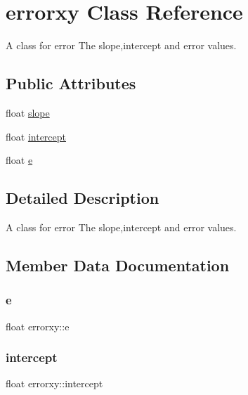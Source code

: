\hypertarget{classerrorxy}{}\section{errorxy Class Reference}
\label{classerrorxy}


A class for error  The slope,intercept and error values.  


\subsection*{Public Attributes}
\begin{DoxyCompactItemize}
\item 
float \hyperlink{classerrorxy_a78038a0cf07f5680a7b48a0bfb6883d3}{slope}
\item 
float \hyperlink{classerrorxy_a0f40aaf1eace64d0e7c99446bf5ef33c}{intercept}
\item 
float \hyperlink{classerrorxy_a490a191956280cecef74afb23e134073}{e}
\end{DoxyCompactItemize}


\subsection{Detailed Description}
A class for error  The slope,intercept and error values. 

\subsection{Member Data Documentation}
\mbox{\label{classerrorxy_a490a191956280cecef74afb23e134073}} 
\subsubsection{\texorpdfstring{e}{e}}
{\footnotesize\ttfamily float errorxy\+::e}

\mbox{\label{classerrorxy_a0f40aaf1eace64d0e7c99446bf5ef33c}} 
\subsubsection{\texorpdfstring{intercept}{intercept}}
{\footnotesize\ttfamily float errorxy\+::intercept}

